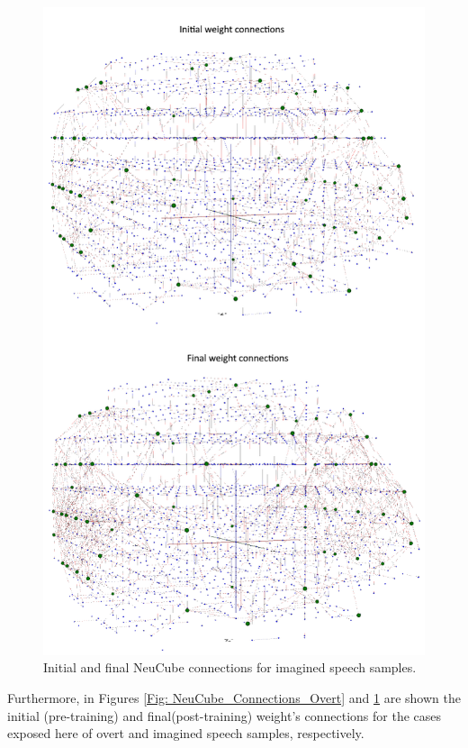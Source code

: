 \begin{figure}[h!]
\centering
\includegraphics[scale=0.77]{Figures/NeuCube_Connections_Imagined.png}
\caption{Initial and final NeuCube connections for imagined speech samples.}
\label{Fig: NeuCube_Connections_Imagined}
\end{figure}

Furthermore, in Figures \ref{Fig: NeuCube_Connections_Overt} and \ref{Fig: NeuCube_Connections_Imagined} are shown the initial (pre-training) and final\linebreak[4] (post-training) weight's connections for the cases exposed here of overt and imagined speech samples, respectively.\\

